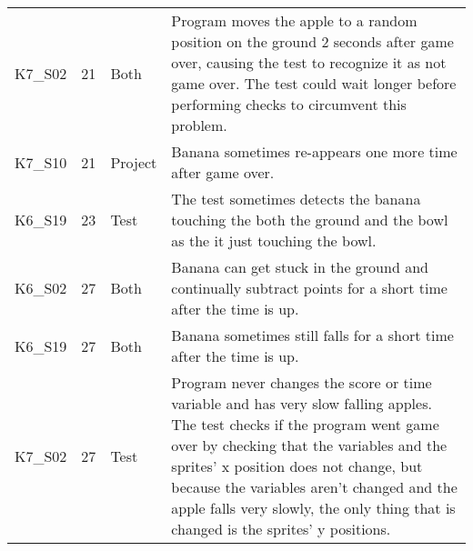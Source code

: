 \begin{table}[htpb]
{\begin{tabular}{lrlp{11.25cm}}
        K7\_S02 & 21   & Both    & Program moves the apple to a random position on the ground 2 seconds after game over, causing the test to recognize it as not game over.
                                   The test could wait longer before performing checks to circumvent this problem. \\
        K7\_S10 & 21   & Project & Banana sometimes re-appears one more time after game over. \\
        K6\_S19 & 23   & Test    & The test sometimes detects the banana touching the both the ground and the bowl as the it just touching the bowl. \\

        K6\_S02 & 27   & Both    & Banana can get stuck in the ground and continually subtract points for a short time after the time is up. \\
        K6\_S19 & 27   & Both    & Banana sometimes still falls for a short time after the time is up. \\
        K7\_S02 & 27   & Test    & Program never changes the score or time variable and has very slow falling apples.
                                   The test checks if the program went game over by checking that the variables and the sprites' x position does not change,
                                   but because the variables aren't changed and the apple falls very slowly, the only thing that is changed is the sprites' y positions. \\
        \bottomrule
    \end{tabular}
    }

    \medskip


\end{table}
